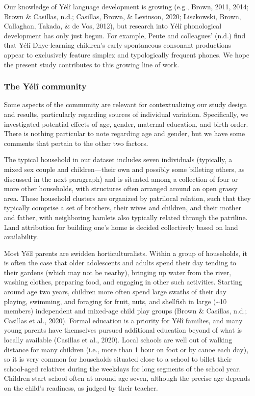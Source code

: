 \documentclass[english,,man,floatsintext]{apa6}
\begin{document}
Our knowledge of Yélî language development is growing (e.g., Brown, 2011, 2014; Brown \& Casillas, n.d.; Casillas, Brown, \& Levinson, 2020; Liszkowski, Brown, Callaghan, Takada, \& de Vos, 2012), but research into Yélî phonological development has only just begun. For example, Peute and colleagues' (n.d.) find that Yélî Dnye-learning children's early spontaneous consonant productions appear to exclusively feature simplex and typologically frequent phones. We hope the present study contributes to this growing line of work.

\hypertarget{the-yuxe9luxee-community}{%
\subsubsection{The Yélî community}\label{the-yuxe9luxee-community}}

Some aspects of the community are relevant for contextualizing our study design and results, particularly regarding sources of individual variation. Specifically, we investigated potential effects of age, gender, maternal education, and birth order. There is nothing particular to note regarding age and gender, but we have some comments that pertain to the other two factors.

The typical household in our dataset includes seven individuals (typically, a mixed sex couple and children---their own and possibly some billeting others, as discussed in the next paragraph) and is situated among a collection of four or more other households, with structures often arranged around an open grassy area. These household clusters are organized by patrilocal relation, such that they typically comprise a set of brothers, their wives and children, and their mother and father, with neighboring hamlets also typically related through the patriline. Land attribution for building one's home is decided collectively based on land availability.

Most Yélî parents are swidden horticulturalists. Within a group of households, it is often the case that older adolescents and adults spend their day tending to their gardens (which may not be nearby), bringing up water from the river, washing clothes, preparing food, and engaging in other such activities. Starting around age two years, children more often spend large swaths of their day playing, swimming, and foraging for fruit, nuts, and shellfish in large (\textasciitilde{}10 members) independent and mixed-age child play groups (Brown \& Casillas, n.d.; Casillas et al., 2020). Formal education is a priority for Yélî families, and many young parents have themselves pursued additional education beyond of what is locally available (Casillas et al., 2020). Local schools are well out of walking distance for many children (i.e., more than 1 hour on foot or by canoe each day), so it is very common for households situated close to a school to billet their school-aged relatives during the weekdays for long segments of the school year. Children start school often at around age seven, although the precise age depends on the child's readiness, as judged by their teacher.
\end{document}
